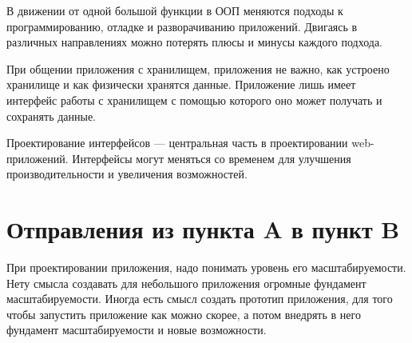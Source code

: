 В движении от одной большой функции в ООП меняются подходы к программированию, отладке и разворачиванию приложений. Двигаясь в различных направлениях можно потерять плюсы и минусы каждого подхода.

При общении приложения с хранилищем, приложения не важно, как устроено хранилище и как физически хранятся данные. Приложение лишь имеет интерфейс работы с хранилищем с помощью которого оно может получать и сохранять данные.


Проектирование интерфейсов --- центральная часть в проектировании web-приложений. Интерфейсы могут меняться со временем для улучшения производительности и увеличения возможностей. 

\section{ Отправления из пункта A в пункт B } \label{sect2_4}

При проектировании приложения, надо понимать уровень его масштабируемости. Нету смысла создавать для небольшого приложения огромные фундамент масштабируемости. Иногда есть смысл создать прототип приложения, для того чтобы запустить приложение как можно скорее, а потом внедрять в него фундамент масштабируемости и новые возможности.























\clearpage


